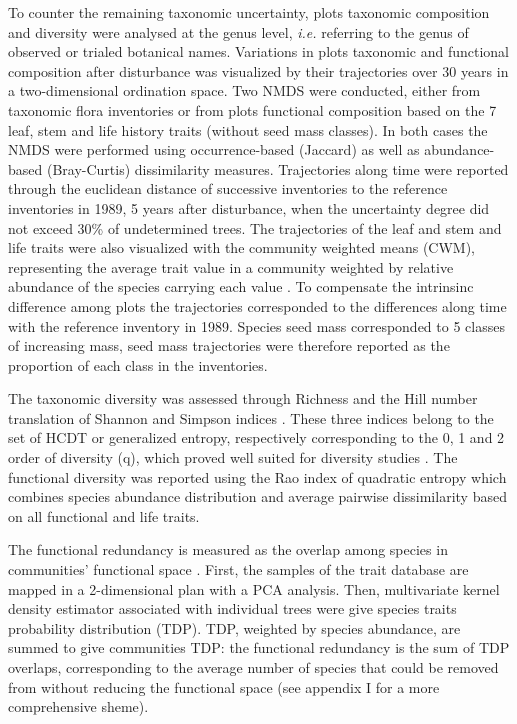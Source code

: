 \documentclass[fleqn,10pt]{ArtEcoFoG} %
\theoremstyle{definition}
\theoremstyle{definition}
\theoremstyle{definition}
\theoremstyle{remark}
\begin{document}
To counter the remaining taxonomic uncertainty, plots taxonomic
composition and diversity were analysed at the genus level, \emph{i.e.}
referring to the genus of observed or trialed botanical names.
Variations in plots taxonomic and functional composition after
disturbance was visualized by their trajectories over 30 years in a
two-dimensional ordination space. Two NMDS were conducted, either from
taxonomic flora inventories or from plots functional composition based
on the 7 leaf, stem and life history traits (without seed mass classes).
In both cases the NMDS were performed using occurrence-based (Jaccard)
as well as abundance-based (Bray-Curtis) dissimilarity measures.
Trajectories along time were reported through the euclidean distance of
successive inventories to the reference inventories in 1989, 5 years
after disturbance, when the uncertainty degree did not exceed 30\% of
undetermined trees. The trajectories of the leaf and stem and life
traits were also visualized with the community weighted means (CWM),
representing the average trait value in a community weighted by relative
abundance of the species carrying each value
\citep{Diaz2007, Garnier2004}. To compensate the intrinsinc difference
among plots the trajectories corresponded to the differences along time
with the reference inventory in 1989. Species seed mass corresponded to
5 classes of increasing mass, seed mass trajectories were therefore
reported as the proportion of each class in the inventories.

The taxonomic diversity was assessed through Richness and the Hill
number translation of Shannon and Simpson indices \citep{Hill1973}.
These three indices belong to the set of HCDT or generalized entropy,
respectively corresponding to the 0, 1 and 2 order of diversity (q),
which proved well suited for diversity studies
\citep{Patil1982, Tothmeresz1995}. The functional diversity was reported
using the Rao index of quadratic entropy which combines species
abundance distribution and average pairwise dissimilarity based on all
functional and life traits.

The functional redundancy is measured as the overlap among species in
communities' functional space \citep{Carmona2016}. First, the samples of
the trait database are mapped in a 2-dimensional plan with a PCA
analysis. Then, multivariate kernel density estimator associated with
individual trees were give species traits probability distribution
(TDP). TDP, weighted by species abundance, are summed to give
communities TDP: the functional redundancy is the sum of TDP overlaps,
corresponding to the average number of species that could be removed
from without reducing the functional space (see appendix I for a more
comprehensive sheme).
\end{document}
